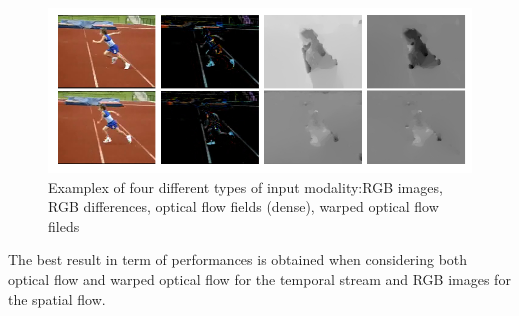 \begin{figure}[h]
    \centering
    \includegraphics[scale=0.7]{img/4mod.png}
    \caption{Examplex of four different types of input modality:RGB images, RGB differences, optical flow fields (dense), warped optical flow fileds}
\end{figure}

The best result in term of performances is obtained when considering both optical flow and warped optical flow for the temporal stream and RGB images for the spatial flow.